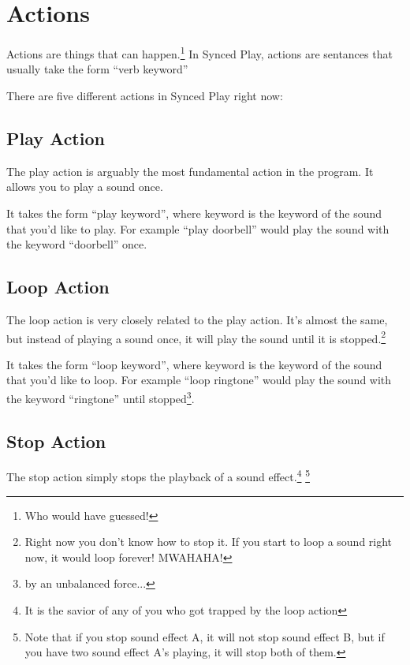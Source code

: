 \documentclass{article}
\begin{document}
\newpage

\section{Actions}

Actions are things that can happen.\footnote{Who would have guessed!} In
Synced Play, actions are sentances that usually take the form ``verb keyword''

There are five different actions in Synced Play right now:

\subsection{Play Action}

The play action is arguably the most fundamental action in the program.
It allows you to play a sound once.

It takes the form ``play keyword'', where keyword is the keyword of the 
sound that you'd like to play. For example ``play doorbell'' would play
the sound with the keyword ``doorbell'' once.

\subsection{Loop Action}

The loop action is very closely related to the play action. It's almost
the same, but instead of playing a sound once, it will play the sound until
it is stopped.\footnote{Right now you don't know how to stop it. If you
start to loop a sound right now, it would loop forever! MWAHAHA!}

It takes the form ``loop keyword'', where keyword is the keyword of the 
sound that you'd like to loop. For example ``loop ringtone'' would play
the sound with the keyword ``ringtone'' until stopped\footnote{by an
unbalanced force...\footnotemark}.

\subsection{Stop Action}

The stop action simply stops the playback of a sound effect.\footnote{It
is the savior of any of you who got trapped by the loop action} \footnote{
Note that if you stop sound effect A, it will not stop sound effect B,
but if you have two sound effect A's playing, it will stop both of them.}
\end{document}
